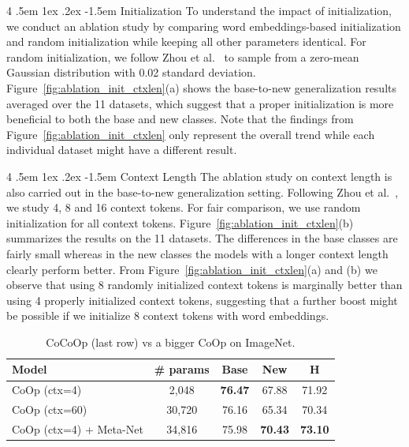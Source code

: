 \documentclass[10pt,twocolumn,letterpaper]{article}
\makeatletter
\renewcommand\paragraph{
  \@startsection{paragraph} %
  {4} %
  {\z@} %
  {.5em \@plus1ex \@minus.2ex} %
  {-1.5em} %
  {\normalfont\normalsize\bfseries} %
}
\newcommand{\tableCellHeight}{1}
\newcommand{\tabstyle}[1]{
  \setlength{\tabcolsep}{#1}
  \renewcommand{\arraystretch}{\tableCellHeight}
  \centering
  \small
}
\makeatother
\begin{document}
\paragraph{Initialization}
To understand the impact of initialization, we conduct an ablation study by comparing word embeddings-based initialization and random initialization while keeping all other parameters identical. For random initialization, we follow Zhou et al.~\cite{zhou2021coop} to sample from a zero-mean Gaussian distribution with 0.02 standard deviation. Figure~\ref{fig:ablation_init_ctxlen}(a) shows the base-to-new generalization results averaged over the 11 datasets, which suggest that a proper initialization is more beneficial to both the base and new classes. Note that the findings from Figure~\ref{fig:ablation_init_ctxlen} only represent the overall trend while each individual dataset might have a different result.


\paragraph{Context Length}
The ablation study on context length is also carried out in the base-to-new generalization setting. Following Zhou et al.~\cite{zhou2021coop}, we study 4, 8 and 16 context tokens. For fair comparison, we use random initialization for all context tokens. Figure~\ref{fig:ablation_init_ctxlen}(b) summarizes the results on the 11 datasets. The differences in the base classes are fairly small whereas in the new classes the models with a longer context length clearly perform better. From Figure~\ref{fig:ablation_init_ctxlen}(a) and (b) we observe that using 8 randomly initialized context tokens is marginally better than using 4 properly initialized context tokens, suggesting that a further boost might be possible if we initialize 8 context tokens with word embeddings.


\begin{table}[t]
    \tabstyle{3pt}
    \caption{CoCoOp (last row) vs a bigger CoOp on ImageNet.
    }
    \label{tab:vs_bigger_coop}
    \begin{tabular}{l c c c | c}
    \toprule
    Model & \# params & Base & New & H \\
    \midrule
    CoOp (ctx=4) & 2,048 & \textbf{76.47} & 67.88 & 71.92 \\
    CoOp (ctx=60) & 30,720 & 76.16 & 65.34 & 70.34 \\
    \rowcolor{tabhighlight}
    CoOp (ctx=4) + Meta-Net & 34,816 & 75.98 & \textbf{70.43} & \textbf{73.10} \\
    \bottomrule
    \end{tabular}
\end{table}
\end{document}
